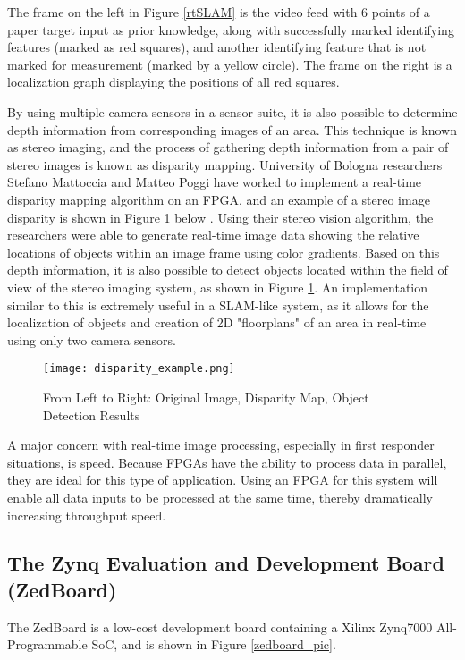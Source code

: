 The frame on the left in Figure \ref{rtSLAM} is the video feed with 6 points of a paper target input as prior knowledge, along with successfully marked identifying features (marked as red squares), and another identifying feature that is not marked for measurement (marked by a yellow circle). The frame on the right is a localization graph displaying the positions of all red squares.
\par
By using multiple camera sensors in a sensor suite, it is also possible to determine depth information from corresponding images of an area. This technique is known as stereo imaging, and the process of gathering depth information from a pair of stereo images is known as disparity mapping. University of Bologna researchers Stefano Mattoccia and Matteo Poggi have worked to implement a real-time disparity mapping algorithm on an FPGA, and an example of a stereo image disparity is shown in Figure \ref{disparity_example} below \cite{mattoccia}. Using their stereo vision algorithm, the researchers were able to generate real-time image data showing the relative locations of objects within an image frame using color gradients. Based on this depth information, it is also possible to detect objects located within the field of view of the stereo imaging system, as shown in Figure \ref{disparity_example}. An implementation similar to this is extremely useful in a SLAM-like system, as it allows for the localization of objects and creation of 2D "floorplans" of an area in real-time using only two camera sensors.
\par
\begin{figure}[H]
	\centerline{\texttt{[image: disparity\_example.png]}}
	\caption{From Left to Right: Original Image, Disparity Map, Object Detection Results \cite{mattoccia}}
	\label{disparity_example}
\end{figure}
\par
A major concern with real-time image processing, especially in first responder situations, is speed. Because FPGAs have the ability to process data in parallel, they are ideal for this type of application. Using an FPGA for this system will enable all data inputs to be processed at the same time, thereby dramatically increasing throughput speed. 

\subsection{The Zynq Evaluation and Development Board (ZedBoard)}
The ZedBoard is a low-cost development board containing a Xilinx Zynq7000 All-Programmable SoC, and is shown in Figure \ref{zedboard_pic}.

